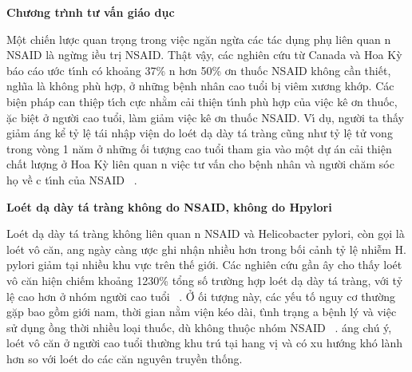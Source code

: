 \documentclass[9pt,twocolumn]{article}
\begin{document}
\textbf{Chương tr\`{\i}nh tư vấn gi\'{a}o d\d{u}c}

M{\^{\d{o}}}t chi{{\'{\^{e}}}}n lược quan tr\d{o}ng trong vi{\^{\d{e}}}c ng{\u{a}}n ngừa c\'{a}c t\'{a}c d\d{u}ng ph\d{u} li{\^{e}}n quan n NSAID l\`{a} ngừng \text{\dj}iều tr\d{i} NSAID. Th{\^{\d{a}}}t v{\^{\d{a}}}y, c\'{a}c nghi{\^{e}}n cứu từ Canada v\`{a} Hoa Kỳ  b\'{a}o c\'{a}o ước t\'{\i}nh c{\'{o}} khoảng 37\% n hơn 50\% \text{\dj}ơn thuốc NSAID kh{\^o}ng cần thi{{\'{\^{e}}}}t, ngh{\~{\i}}a l\`{a} kh{\^o}ng ph\`{u} hợp, ở những b{\^{\d{e}}}nh nh\^{a}n cao tuổi b\d{i} vi{\^{e}}m xương khớp. C\'{a}c bi{\^{\d{e}}}n ph\'{a}p can thi{\^{\d{e}}}p t\'{\i}ch cực nhằm cải thi{\^{\d{e}}}n t\'{\i}nh ph\`{u} hợp của vi{\^{\d{e}}}c k{\^{e}} \text{\dj}ơn thuốc, \text{\dj}ặc bi{\^{\d{e}}}t ở người cao tuổi,  l\`{a}m giảm vi{\^{\d{e}}}c k{\^{e}} \text{\dj}ơn thuốc NSAID. V\'{\i} d\d{u}, người ta thấy giảm \text{\dj}\'{a}ng kể tỷ l{\^{\d{e}}} t\'{a}i nh{\^{\d{a}}}p vi{\^{\d{e}}}n do lo{\'e}t d{\d{a}} d\`{a}y t\'{a} tr\`{a}ng c{\~{u}}ng như tỷ l{\^{\d{e}}} tử vong trong v\`{o}ng 1 n{\u{a}}m ở những \text{\dj}ối tượng cao tuổi tham gia v\`{a}o m{\^{\d{o}}}t dự \'{a}n cải thi{\^{\d{e}}}n chất lượng ở Hoa Kỳ li{\^{e}}n quan n vi{\^{\d{e}}}c tư vấn cho b{\^{\d{e}}}nh nh\^{a}n v\`{a} người ch{\u{a}}m s{\'{o}}c h\d{o} về c t\'{\i}nh của NSAID\unskip~\cite{2901310:34531806} .

\textbf{Lo{\'e}t d{\d{a}} d\`{a}y t\'{a} tr\`{a}ng kh{\^o}ng do NSAID, kh{\^o}ng do H}\textbf{\space }\textbf{pylori} \textbf{\space }

Lo{\'e}t d{\d{a}} d\`{a}y t\'{a} tr\`{a}ng kh{\^o}ng li{\^{e}}n quan n NSAID v\`{a} Helicobacter pylori, c\`{o}n g\d{o}i l\`{a} lo{\'e}t v{\^o} c{\u{a}}n, \text{\dj}ang ng\`{a}y c\`{a}ng \text{\dj}ược ghi nh{\^{\d{a}}}n nhiều hơn trong bối cảnh tỷ l{\^{\d{e}}} nhi{\~{\^e}}m H. pylori giảm t{\d{a}}i nhiều khu vực tr{\^{e}}n th{{\'{\^{e}}}} giới. C\'{a}c nghi{\^{e}}n cứu gần \text{\dj}\^{a}y cho thấy lo{\'e}t v{\^o} c{\u{a}}n hi{\^{\d{e}}}n chi{{\'{\^{e}}}}m khoảng 12{\textendash}30\% tổng số trường hợp lo{\'e}t d{\d{a}} d\`{a}y t\'{a} tr\`{a}ng, với tỷ l{\^{\d{e}}} cao hơn ở nh{\'{o}}m người cao tuổi\unskip~\cite{2901310:34531813,2901310:34531814} . Ở \text{\dj}ối tượng n\`{a}y, c\'{a}c y{{\'{\^{e}}}}u tố nguy cơ thường gặp bao gồm giới nam, thời gian nằm vi{\^{\d{e}}}n k{\'e}o d\`{a}i, t\`{\i}nh tr{\d{a}}ng \text{\dj}a b{\^{\d{e}}}nh l\'{y} v\`{a} vi{\^{\d{e}}}c sử d\d{u}ng \text{\dj}ồng thời nhiều lo{\d{a}}i thuốc, d\`{u} kh{\^o}ng thu{\^{\d{o}}}c nh{\'{o}}m NSAID\unskip~\cite{2901310:34531813,2901310:34531814} . \text{\DJ}\'{a}ng ch\'{u} \'{y}, lo{\'e}t v{\^o} c{\u{a}}n ở người cao tuổi thường khu tr\'{u} t{\d{a}}i hang v\d{i} v\`{a} c{\'{o}} xu hướng kh{\'{o}} l\`{a}nh hơn so với lo{\'e}t do c\'{a}c c{\u{a}}n nguy{\^{e}}n truyền thống.
\end{document}
